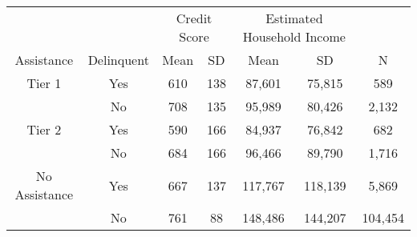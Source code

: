 \begin{tabular}{ccccccc}
\toprule 
\midrule 
 &  & \multicolumn{2}{c}{Credit Score} & \multicolumn{2}{c}{Estimated Household Income} &  \\
 \cmidrule(lr){3-4} \cmidrule(lr){5-6} 
Assistance & Delinquent & Mean & SD & Mean & SD & N \\
\midrule 
Tier 1 & Yes & 610 & 138 & 87,601 & 75,815 & 589 \\
 & No & 708 & 135 & 95,989 & 80,426 & 2,132 \\
\midrule 
Tier 2 & Yes & 590 & 166 & 84,937 & 76,842 & 682 \\
 & No & 684 & 166 & 96,466 & 89,790 & 1,716 \\
\midrule 
No Assistance & Yes & 667 & 137 & 117,767 & 118,139 & 5,869 \\
 & No & 761 & 88 & 148,486 & 144,207 & 104,454 \\
\midrule 
\bottomrule 
\end{tabular}

